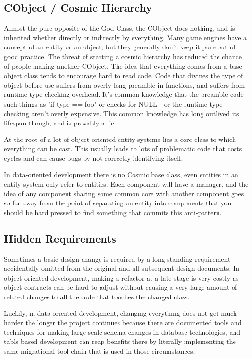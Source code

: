 \subsection{CObject / Cosmic Hierarchy}

Almost the pure opposite of the God Class, the CObject does nothing, and is
inherited whether directly or indirectly by everything.  Many game engines have
a concept of an entity or an object, but they generally don't keep it pure out
of good practice. The threat of starting a cosmic hierarchy has reduced the
chance of people making another CObject. The idea that everything comes from a
base object class tends to encourage hard to read code. Code that divines the
type of object before use suffers from overly long preamble in functions, and
suffers from runtime type checking overhead. It's common knowledge that the
preamble code - such things as "if type == foo" or checks for NULL - or the
runtime type checking aren't overly expensive. This common knowledge has long
outlived its lifespan though, and is provably a lie.

At the root of a lot of object-oriented entity systems lies a core class to
which everything can be cast. This usually leads to lots of problematic code
that costs cycles and can cause bugs by not correctly identifying itself.

In data-oriented development there is no Cosmic base class, even entities in an
entity system only refer to entities. Each component will have a manager, and
the idea of any component sharing some common core with another component goes
so far away from the point of separating an entity into components that you
should be hard pressed to find something that commits this anti-pattern.

\subsection{Hidden Requirements}

Sometimes a basic design change is required by a long standing requirement
accidentally omitted from the original and all subsequent design documents. In
object-oriented development, making a refactor at a late stage is very costly
as object contracts can be hard to adjust without causing a very large amount
of related changes to all the code that touches the changed class.

Luckily, in data-oriented development, changing everything does not get much
harder the longer the project continues because there are documented tools and
techniques for making large scale schema changes in database technologies, and
table based development can reap benefits there by literally implementing the
same migrational tool-chain that is used in those circumstances.

